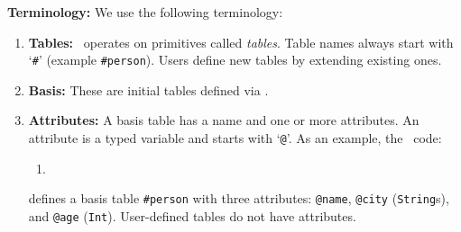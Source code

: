 \textbf{Terminology:} We use the following terminology:
\begin{enumerate}
	\item \textbf{Tables:} \dsl~operates on primitives called {\em tables}. Table names always start with `\texttt{\#}' (example \texttt{\#person}). Users define new tables by extending existing ones. 
	\item \textbf{Basis:} These are initial tables defined via \dcl. 
	\item \textbf{Attributes:} A basis table has a name and one or more attributes. 
	An attribute is a typed variable and starts with `\texttt{@}'. As an example, the \dcl~code: 
\begin{enumerate}
	\item[] 
\end{enumerate}
defines a basis table \texttt{\#person} with three attributes: \texttt{@name}, \texttt{@city} (\texttt{String}s), and \texttt{@age} (\texttt{Int}). %
User-defined tables do not have attributes. %

\end{enumerate}
%
%
